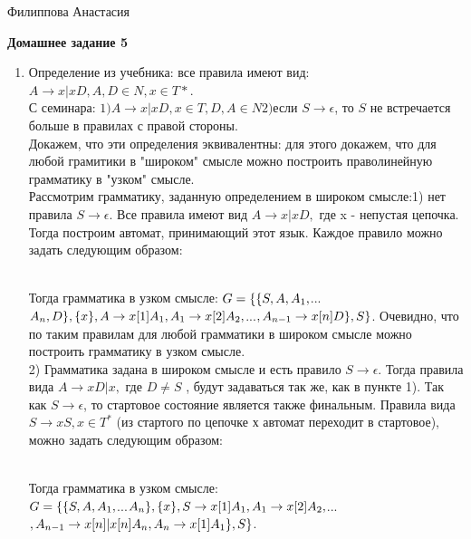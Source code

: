 \documentclass[10pt]{amsart}
\theoremstyle{plain}
\theoremstyle{remark}
\theoremstyle{definition}
\begin{document}
    \textup{Филиппова Анастасия}

\begin{center}

    \large\textbf{Домашнее задание 5}
    

\end{center}
\begin{enumerate}
\item Определение из учебника: все правила имеют вид: $A\rightarrow x|xD, A,D \in N, x\in T*$.\\
С семинара: $1)A\rightarrow x|xD,x\in T, D,A\in N 2)$если $S\rightarrow \epsilon$, то $S$ не встречается больше в правилах с правой стороны. \\
Докажем, что эти определения эквивалентны: для этого докажем, что для любой грамитики в "широком" смысле можно построить праволинейную грамматику в "узком" смысле.\\
Рассмотрим грамматику, заданную определением в широком смысле:1) нет правила $S \rightarrow \epsilon$. Все правила имеют вид $A\rightarrow x|xD,$ где x - непустая цепочка. Тогда построим автомат, принимающий этот язык. Каждое правило можно задать следующим образом:\\
\begin{figure}[h]
\end{figure}\\
Тогда грамматика в узком смысле: $G = \small\{\small\{S,A, A_1,$...$A_n,D\small\}, \small\{x\small\}, A\rightarrow x[1]A_1, A_1\rightarrow x[2]A_2,$...$, A_{n-1} \rightarrow x[n]D\small\}, S\small\}$. Очевидно, что по таким правилам для любой грамматики в широком смысле можно построить грамматику в узком смысле.\\
2) Грамматика задана в широком смысле и есть правило $S \rightarrow \epsilon $. Тогда правила вида $A \rightarrow xD|x,$ где $D \neq S$ , будут задаваться так же, как в пункте 1). Так как $S \rightarrow \epsilon$, то стартовое состояние является также финальным. Правила вида $S \rightarrow xS, x\in T^*$ (из стартого по цепочке х автомат переходит в стартовое), можно задать следующим образом:\\
\begin{figure}[h]
\end{figure}\\
Тогда грамматика в узком смысле:\\
$G = \small\{\small\{S,A, A_1,$...$A_n\small\}, \small\{x\small\}, S\rightarrow x[1]A_1, A_1\rightarrow x[2]A_2,$...$, A_{n-1} \rightarrow x[n]|x[n]A_n, A_n\rightarrow x[1]A_1\small\}, S\small\}$.\\

\end{enumerate}
\end{document}

